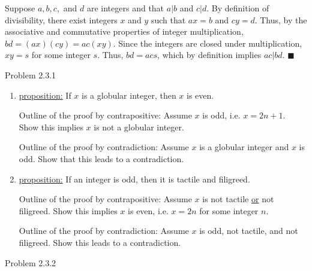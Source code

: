 \documentclass{article}
\theoremstyle{definition}
\begin{document}
	Suppose $a, b, c,$ and $d$ are integers and that $a|b$ and $c|d$. By
	definition of divisibility, there exist integers $x$ and $y$ such
	that $ax=b$ and $cy=d$. Thus, by the associative and commutative
	properties of integer multiplication, $bd=(ax)(cy)=ac(xy)$. Since
	the integers are closed under multiplication, $xy=s$ for some
	integer $s$. Thus, $bd=acs$, which by definition implies $ac|bd$.
	$\blacksquare$

	\vspace{1cm}




	\noindent Problem 2.3.1  \vspace{0.3cm}

	\begin{enumerate}
		\item[2] \underline{proposition:} If $x$ is a globular integer, then
		$x$ is even.

		\vspace{.2cm}

		Outline of the proof by contrapositive: Assume $x$ is odd, i.e.
		$x=2n+1$. Show this implies $x$ is not a globular integer.

		Outline of the proof by contradiction: Assume $x$ is a globular
		integer and $x$ is odd. Show that this leads to a contradiction.

		\item[4] \underline{proposition:} If an integer is odd, then it is
		tactile and filigreed.

		\vspace{.2cm}

		Outline of the proof by contrapositive: Assume $x$ is not tactile
		\underline{or} not filigreed. Show this implies $x$ is even, i.e.
		$x=2n$ for some integer $n$.

		Outline of the proof by contradiction: Assume $x$ is odd, not
		tactile, and not filigreed. Show this leads to a contradiction.
	\end{enumerate}

	\vspace{1cm}


	\noindent Problem 2.3.2  \vspace{0.3cm}
\end{document}
